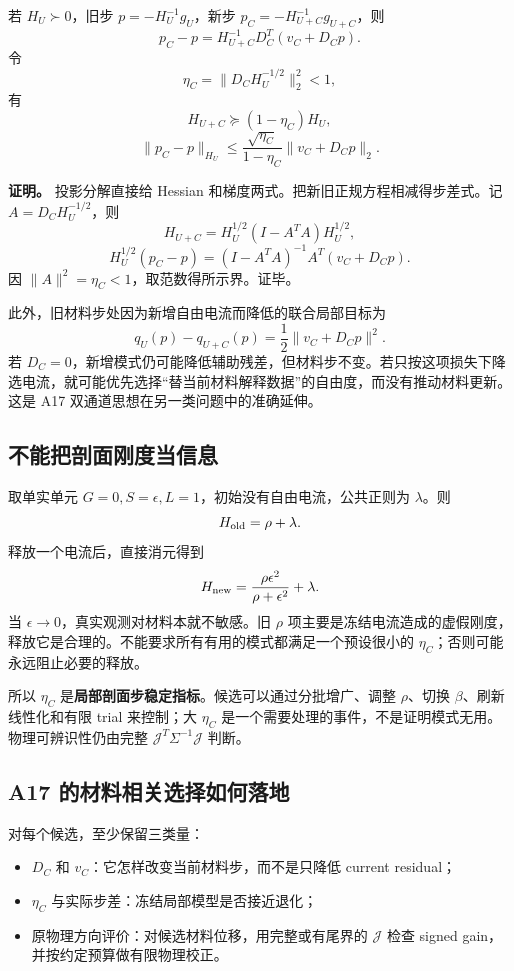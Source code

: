 \documentclass[10pt,a4paper]{article}
\providecommand{\tightlist}{\setlength{\itemsep}{0pt}\setlength{\parskip}{0pt}}
\begin{document}
若 \(H_U\succ0\)，旧步 \(p=-H_U^{-1}g_U\)，新步
\(p_C=-H_{U+C}^{-1}g_{U+C}\)，则
\[\boxed{p_C-p=H_{U+C}^{-1}D_C^T(v_C+D_Cp).}\] 令
\[\eta_C=\|D_CH_U^{-1/2}\|_2^2<1,\] 有 \[H_{U+C}\succeq(1-\eta_C)H_U,\]
\[\boxed{\|p_C-p\|_{H_U}\le
\frac{\sqrt{\eta_C}}{1-\eta_C}\|v_C+D_Cp\|_2.}\]

\textbf{证明。} 投影分解直接给 Hessian
和梯度两式。把新旧正规方程相减得步差式。记 \(A=D_CH_U^{-1/2}\)，则
\[H_{U+C}=H_U^{1/2}(I-A^TA)H_U^{1/2},\]
\[H_U^{1/2}(p_C-p)=(I-A^TA)^{-1}A^T(v_C+D_Cp).\] 因
\(\|A\|^2=\eta_C<1\)，取范数得所示界。证毕。

此外，旧材料步处因为新增自由电流而降低的联合局部目标为
\[q_U(p)-q_{U+C}(p)=\frac12\|v_C+D_Cp\|^2.\] 若
\(D_C=0\)，新增模式仍可能降低辅助残差，但材料步不变。若只按这项损失下降选电流，就可能优先选择``替当前材料解释数据''的自由度，而没有推动材料更新。这是
A17 双通道思想在另一类问题中的准确延伸。

\hypertarget{ux4e0dux80fdux628aux5256ux9762ux521aux5ea6ux5f53ux4fe1ux606f}{%
\subsection{不能把剖面刚度当信息}\label{ux4e0dux80fdux628aux5256ux9762ux521aux5ea6ux5f53ux4fe1ux606f}}

取单实单元 \(G=0,S=\epsilon,L=1\)，初始没有自由电流，公共正则为
\(\lambda\)。则 \[H_{\rm old}=\rho+\lambda.\]
释放一个电流后，直接消元得到
\[H_{\rm new}=\frac{\rho\epsilon^2}{\rho+\epsilon^2}+\lambda.\] 当
\(\epsilon\to0\)，真实观测对材料本就不敏感。旧 \(\rho\)
项主要是冻结电流造成的虚假刚度，释放它是合理的。不能要求所有有用的模式都满足一个预设很小的
\(\eta_C\)；否则可能永远阻止必要的释放。

所以 \(\eta_C\)
是\textbf{局部剖面步稳定指标}。候选可以通过分批增广、调整 \(\rho\)、切换
\(\beta\)、刷新线性化和有限 trial 来控制；大 \(\eta_C\)
是一个需要处理的事件，不是证明模式无用。物理可辨识性仍由完整
\(\mathcal J^T\Sigma^{-1}\mathcal J\) 判断。

\hypertarget{a17-ux7684ux6750ux6599ux76f8ux5173ux9009ux62e9ux5982ux4f55ux843dux5730}{%
\subsection{A17
的材料相关选择如何落地}\label{a17-ux7684ux6750ux6599ux76f8ux5173ux9009ux62e9ux5982ux4f55ux843dux5730}}

对每个候选，至少保留三类量：

\begin{itemize}
\tightlist
\item
  \(D_C\) 和 \(v_C\)：它怎样改变当前材料步，而不是只降低 current
  residual；
\item
  \(\eta_C\) 与实际步差：冻结局部模型是否接近退化；
\item
  原物理方向评价：对候选材料位移，用完整或有尾界的 \(\mathcal J\) 检查
  signed gain，并按约定预算做有限物理校正。
\end{itemize}
\end{document}
